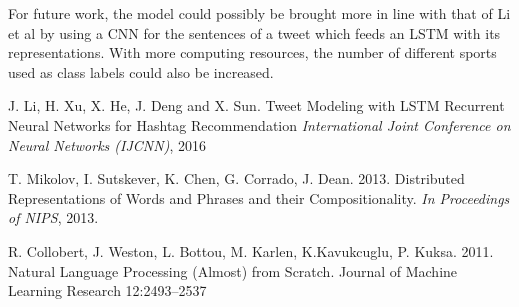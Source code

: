 \documentclass[journal, a4paper]{IEEEtran}
\begin{document}
For future work, the model could possibly be brought more in line with that of Li et al \cite{Li-lstm} by using a CNN for the sentences of a tweet which feeds an LSTM with its representations. With more computing resources, the number of different sports used as class labels could also be increased.

\begin{thebibliography}{5}

	J. Li, H. Xu, X. He, J. Deng and X. Sun. Tweet Modeling with LSTM Recurrent Neural
	Networks for Hashtag Recommendation {\em International Joint Conference on Neural Networks (IJCNN)}, 2016

	T. Mikolov, I. Sutskever, K. Chen, G. Corrado, J. Dean. 2013. Distributed Representations of Words and Phrases and their Compositionality. {\em In Proceedings of NIPS}, 2013.

	R. Collobert, J. Weston, L. Bottou, M. Karlen, K.Kavukcuglu, P. Kuksa. 2011. Natural Language Processing (Almost) from Scratch. Journal of Machine Learning Research 12:2493–2537
\end{thebibliography}

\end{document}
